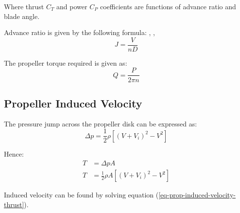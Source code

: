 Where thrust $C_T$ and power $C_P$ coefficients are functions of advance ratio and blade angle.

Advance ratio is given by the following formula: \cite{Allerton2009}, \cite{Raymer1992}, \cite{Torenbeek1982}
\begin{equation}
  J = \frac{V}{nD}
\end{equation}

The propeller torque required is given as: \cite{ResnickHalliday2011}
\begin{equation}
  Q = \frac{P}{2 \pi n}
\end{equation}

\subsection{Propeller Induced Velocity}

The pressure jump across the propeller disk can be expressed as:
\begin{equation}
  \Delta p = \frac{1}{2} \rho \left[ \left( V + V_i \right)^2 - V^2 \right]
\end{equation}

Hence:
\begin{align}
  T &= \Delta p A \\
  \label{eq-prop-induced-velocity-thrust}
  T &= \frac{1}{2} \rho A \left[ \left( V + V_i \right)^2 - V^2 \right]
\end{align}

Induced velocity can be found by solving equation (\ref{eq-prop-induced-velocity-thrust}).




